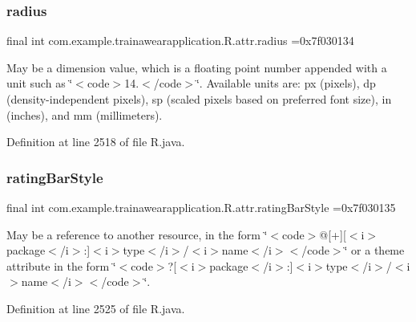 \subsubsection{\texorpdfstring{radius}{radius}}
{\footnotesize\ttfamily final int com.\+example.\+trainawearapplication.\+R.\+attr.\+radius =0x7f030134\hspace{0.3cm}{\ttfamily [static]}}

May be a dimension value, which is a floating point number appended with a unit such as \char`\"{}$<$code$>$14.\+5sp$<$/code$>$\char`\"{}. Available units are\+: px (pixels), dp (density-\/independent pixels), sp (scaled pixels based on preferred font size), in (inches), and mm (millimeters). 

Definition at line 2518 of file R.\+java.

\mbox{\label{classcom_1_1example_1_1trainawearapplication_1_1_r_1_1attr_a34bafe392a36812de67d5c4b403f5940}} 
\subsubsection{\texorpdfstring{ratingBarStyle}{ratingBarStyle}}
{\footnotesize\ttfamily final int com.\+example.\+trainawearapplication.\+R.\+attr.\+rating\+Bar\+Style =0x7f030135\hspace{0.3cm}{\ttfamily [static]}}

May be a reference to another resource, in the form \char`\"{}$<$code$>$@\mbox{[}+\mbox{]}\mbox{[}$<$i$>$package$<$/i$>$\+:\mbox{]}$<$i$>$type$<$/i$>$/$<$i$>$name$<$/i$>$$<$/code$>$\char`\"{} or a theme attribute in the form \char`\"{}$<$code$>$?\mbox{[}$<$i$>$package$<$/i$>$\+:\mbox{]}$<$i$>$type$<$/i$>$/$<$i$>$name$<$/i$>$$<$/code$>$\char`\"{}. 

Definition at line 2525 of file R.\+java.

\mbox{\label{classcom_1_1example_1_1trainawearapplication_1_1_r_1_1attr_a99d57718cef432aaaa53833eaf2d058b}} 
